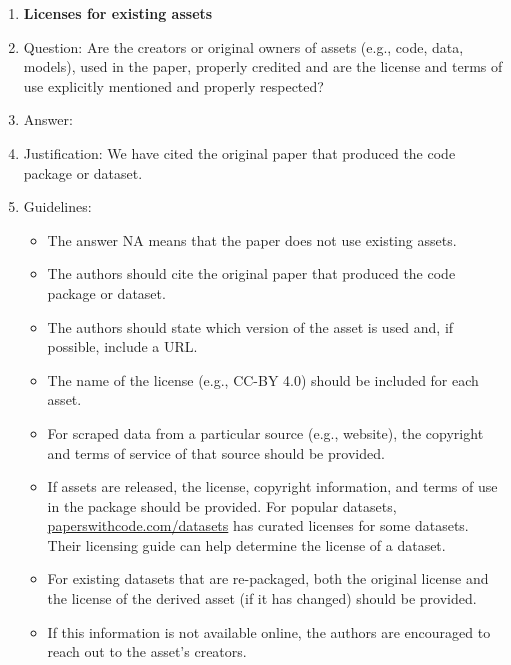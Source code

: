 \documentclass{article}
\theoremstyle{plain}
\theoremstyle{definition}
\theoremstyle{remark}
\begin{document}
\begin{enumerate}
\item {\bf Licenses for existing assets}
    \item[] Question: Are the creators or original owners of assets (e.g., code, data, models), used in the paper, properly credited and are the license and terms of use explicitly mentioned and properly respected?
    \item[] Answer: \answerYes{} %
    \item[] Justification: We have cited the original paper that produced the code package or dataset.
    \item[] Guidelines:
    \begin{itemize}
        \item The answer NA means that the paper does not use existing assets.
        \item The authors should cite the original paper that produced the code package or dataset.
        \item The authors should state which version of the asset is used and, if possible, include a URL.
        \item The name of the license (e.g., CC-BY 4.0) should be included for each asset.
        \item For scraped data from a particular source (e.g., website), the copyright and terms of service of that source should be provided.
        \item If assets are released, the license, copyright information, and terms of use in the package should be provided. For popular datasets, \url{paperswithcode.com/datasets} has curated licenses for some datasets. Their licensing guide can help determine the license of a dataset.
        \item For existing datasets that are re-packaged, both the original license and the license of the derived asset (if it has changed) should be provided.
        \item If this information is not available online, the authors are encouraged to reach out to the asset's creators.
    \end{itemize}


\end{enumerate}
\end{document}
